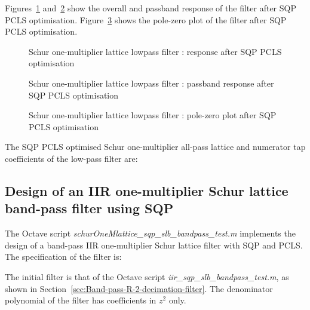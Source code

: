 \documentclass[a4paper,twoside,10pt,english]{report}
\begin{document}
Figures~\ref{fig:Schur-one-multiplier-lattice-lowpass-filter-SQP-PCLS} 
and~\ref{fig:Schur-one-multiplier-lattice-lowpass-filter-SQP-PCLS-pass} 
show the overall and passband response of the filter after SQP PCLS optimisation.
Figure~\ref{fig:Schur-one-multiplier-lattice-lowpass-filter-SQP-PCLS-pz} shows
the pole-zero plot of the filter after SQP PCLS optimisation.
\begin{figure}[!htbp]
\begin{center}
\scalebox{0.7}{}
\caption{Schur one-multiplier lattice lowpass filter : response after SQP PCLS optimisation}
\label{fig:Schur-one-multiplier-lattice-lowpass-filter-SQP-PCLS}
\end{center}
\end{figure}
\begin{figure}[!htbp]
\begin{center}
\scalebox{0.7}{}
\caption{Schur one-multiplier lattice lowpass filter : passband response after SQP PCLS optimisation}
\label{fig:Schur-one-multiplier-lattice-lowpass-filter-SQP-PCLS-pass}
\end{center}
\end{figure}
\begin{figure}[!htbp]
\begin{center}
\scalebox{0.7}{}
\caption{Schur one-multiplier lattice lowpass filter : pole-zero plot after SQP PCLS optimisation}
\label{fig:Schur-one-multiplier-lattice-lowpass-filter-SQP-PCLS-pz}
\end{center}
\end{figure}

The SQP PCLS optimised Schur one-multiplier all-pass lattice and numerator tap 
coefficients of the low-pass filter are:
\begin{small}




\end{small}
\clearpage
\subsection{\label{sec:Design-IIR-one-multiplier-Schur-lattice-band-pass-SQP}Design of an IIR one-multiplier Schur lattice band-pass filter using SQP}
The Octave script \emph{schurOneMlattice\_sqp\_slb\_bandpass\_test.m} implements
the design of a band-pass IIR one-multiplier Schur lattice filter with SQP and 
PCLS. The specification of the filter is:
\begin{small}

\end{small}
The initial filter is that of the Octave script 
\emph{iir\_sqp\_slb\_bandpass\_test.m}, as shown in 
Section~\ref{sec:Band-pass-R-2-decimation-filter}.
The denominator polynomial of the filter has coefficients in $z^{2}$ only.
\end{document}
